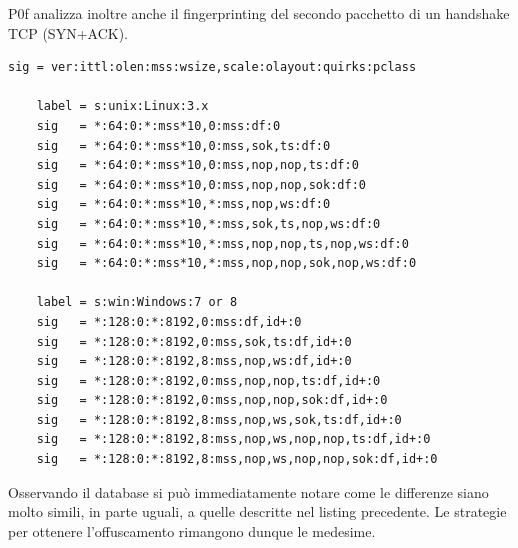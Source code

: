 P0f analizza inoltre anche il fingerprinting del secondo pacchetto di un handshake TCP (SYN+ACK).

\begin{lstlisting}[caption={Database fingerprinting per pacchetti SYN+ACK dell'handshake TCP}]	
	sig = ver:ittl:olen:mss:wsize,scale:olayout:quirks:pclass

	label = s:unix:Linux:3.x
	sig   = *:64:0:*:mss*10,0:mss:df:0
	sig   = *:64:0:*:mss*10,0:mss,sok,ts:df:0
	sig   = *:64:0:*:mss*10,0:mss,nop,nop,ts:df:0
	sig   = *:64:0:*:mss*10,0:mss,nop,nop,sok:df:0
	sig   = *:64:0:*:mss*10,*:mss,nop,ws:df:0
	sig   = *:64:0:*:mss*10,*:mss,sok,ts,nop,ws:df:0
	sig   = *:64:0:*:mss*10,*:mss,nop,nop,ts,nop,ws:df:0
	sig   = *:64:0:*:mss*10,*:mss,nop,nop,sok,nop,ws:df:0
	
	label = s:win:Windows:7 or 8
	sig   = *:128:0:*:8192,0:mss:df,id+:0
	sig   = *:128:0:*:8192,0:mss,sok,ts:df,id+:0
	sig   = *:128:0:*:8192,8:mss,nop,ws:df,id+:0
	sig   = *:128:0:*:8192,0:mss,nop,nop,ts:df,id+:0
	sig   = *:128:0:*:8192,0:mss,nop,nop,sok:df,id+:0
	sig   = *:128:0:*:8192,8:mss,nop,ws,sok,ts:df,id+:0
	sig   = *:128:0:*:8192,8:mss,nop,ws,nop,nop,ts:df,id+:0
	sig   = *:128:0:*:8192,8:mss,nop,ws,nop,nop,sok:df,id+:0
\end{lstlisting}

Osservando il database si può immediatamente notare come le differenze siano molto simili, in parte uguali, a quelle descritte nel listing precedente.
Le strategie per ottenere l'offuscamento rimangono dunque le medesime.








